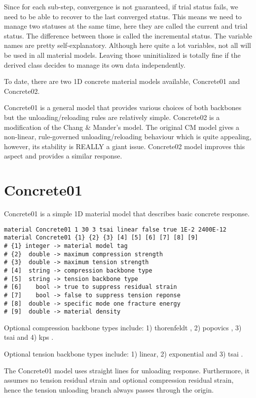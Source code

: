 \documentclass[11pt]{article}
\begin{document}
Since for each sub-step, convergence is not guaranteed, if trial status fails, we need to be able to recover to the last converged status. This means we need to manage two statuses at the same time, here they are called the current and trial status. The difference between those is called the incremental status. The variable names are pretty self-explanatory. Although here quite a lot variables, not all will be used in all material models. Leaving those uninitialized is totally fine if the derived class decides to manage its own data independently.

To date, there are two 1D concrete material models available, Concrete01 and Concrete02.

Concrete01 is a general model that provides various choices of both backbones but the unloading/reloading rules are relatively simple. Concrete02 is a modification of the Chang \& Mander's model. The original CM model gives a non-linear, rule-governed unloading/reloading behaviour which is quite appealing, however, its stability is REALLY a giant issue. Concrete02 model improves this aspect and provides a similar response.
\section{Concrete01}
Concrete01 is a simple 1D material model that describes basic concrete response.
\begin{lstlisting}
material Concrete01 1 30 3 tsai linear false true 1E-2 2400E-12
material Concrete01 {1} {2} {3} [4] [5] [6] [7] [8] [9]
# {1} integer -> material model tag
# {2}  double -> maximum compression strength
# {3}  double -> maximum tension strength
# [4]  string -> compression backbone type
# [5]  string -> tension backbone type
# [6]    bool -> true to suppress residual strain
# [7]    bool -> false to suppress tension reponse
# [8]  double -> specific mode one fracture energy
# [9]  double -> material density
\end{lstlisting}

Optional compression backbone types include: 1) thorenfeldt \citep{Thorenfeldt1987}, 2) popovics \citep{Popovics1973}, 3) tsai \citep{Tsai1988} and 4) kps \citep{Scott1980}.

Optional tension backbone types include: 1) linear, 2) exponential \citep{Belarbi1994} and 3) tsai \citep{Tsai1988}.

The Concrete01 model uses straight lines for unloading response. Furthermore, it assumes no tension residual strain and optional compression residual strain, hence the tension unloading branch always passes through the origin.
\end{document}
